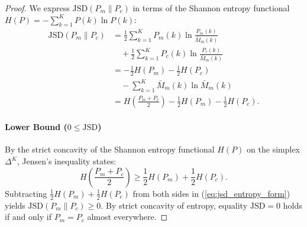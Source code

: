 \documentclass[conference]{IEEEtran}
\begin{document}
\begin{proof}
We express $\mathrm{JSD}(P_m \parallel P_c)$ in terms of the Shannon entropy functional $H(P) = -\sum_{k=1}^K P(k) \ln P(k)$:
\begin{align}
\mathrm{JSD}(P_m \parallel P_c) &= \frac{1}{2} \sum_{k=1}^K P_m(k) \ln \frac{P_m(k)}{\bar{M}_m(k)} \nonumber \\
&\quad + \frac{1}{2} \sum_{k=1}^K P_c(k) \ln \frac{P_c(k)}{\bar{M}_m(k)} \nonumber \\
&= -\frac{1}{2} H(P_m) -\frac{1}{2} H(P_c) \nonumber \\
&\quad - \sum_{k=1}^K \bar{M}_m(k) \ln \bar{M}_m(k) \nonumber \\
&= H\left( \frac{P_m + P_c}{2} \right) - \frac{1}{2} H(P_m) - \frac{1}{2} H(P_c). \label{eq:jsd_entropy_form}
\end{align}

\paragraph{Lower Bound ($0 \le \mathrm{JSD}$)} By the strict concavity of the Shannon entropy functional $H(P)$ on the simplex $\Delta^K$, Jensen's inequality states:
\begin{equation}
H\left( \frac{P_m + P_c}{2} \right) \ge \frac{1}{2} H(P_m) + \frac{1}{2} H(P_c).
\end{equation}
Subtracting $\frac{1}{2} H(P_m) + \frac{1}{2} H(P_c)$ from both sides in (\ref{eq:jsd_entropy_form}) yields $\mathrm{JSD}(P_m \parallel P_c) \ge 0$. By strict concavity of entropy, equality $\mathrm{JSD} = 0$ holds if and only if $P_m = P_c$ almost everywhere.


\end{proof}
\end{document}
